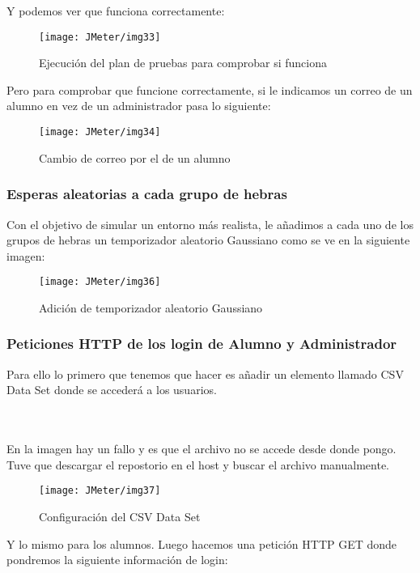 Y podemos ver que funciona correctamente:

\begin{figure}[H]
    \centering
    \texttt{[image: JMeter/img33]}
    \caption{Ejecución del plan de pruebas para comprobar si funciona}
\end{figure}

Pero para comprobar que funcione correctamente, si le indicamos un correo de un alumno en vez de un administrador pasa lo siguiente:

\begin{figure}[H]
    \centering
    \texttt{[image: JMeter/img34]}
    \caption{Cambio de correo por el de un alumno}
\end{figure}

\subsubsection{Esperas aleatorias a cada grupo de hebras}

Con el objetivo de simular un entorno más realista, le añadimos a cada uno de los grupos de hebras un temporizador aleatorio Gaussiano como se ve en la siguiente imagen:

\begin{figure}[H]
    \centering
    \texttt{[image: JMeter/img36]}
    \caption{Adición de temporizador aleatorio Gaussiano}
\end{figure}

\subsubsection{Peticiones HTTP de los login de Alumno y Administrador}

Para ello lo primero que tenemos que hacer es añadir un elemento llamado CSV Data Set donde se accederá a los usuarios.

\\\\
En la imagen hay un fallo y es que el archivo no se accede desde donde pongo. Tuve que descargar el repostorio en el host y buscar el archivo manualmente.
\begin{figure}[H]
    \centering
    \texttt{[image: JMeter/img37]}
    \caption{Configuración del CSV Data Set}
\end{figure}

Y lo mismo para los alumnos. Luego hacemos una petición HTTP GET donde pondremos la siguiente información de login:

